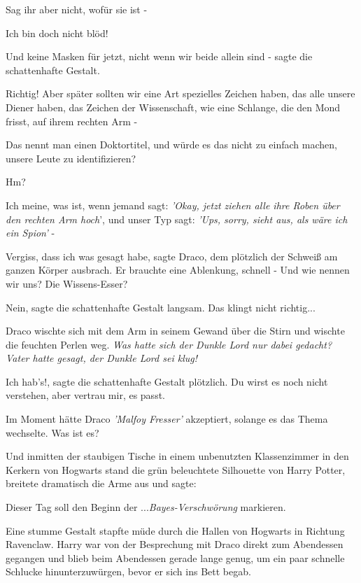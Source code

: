\glqq Sag ihr aber nicht, wofür sie ist -\grqq{}

\glqq Ich bin doch nicht blöd!\grqq{}

\glqq Und keine Masken für jetzt, nicht wenn wir beide allein sind -\grqq{}
sagte die schattenhafte Gestalt.

\glqq Richtig! Aber später sollten wir eine Art spezielles Zeichen haben, das
alle unsere Diener haben, das Zeichen der Wissenschaft, wie eine Schlange, die
den Mond frisst, auf ihrem rechten Arm -\grqq{}

\glqq Das nennt man einen Doktortitel, und würde es das nicht zu einfach machen,
unsere Leute zu identifizieren?\grqq{}

\glqq Hm?\grqq{}

\glqq Ich meine, was ist, wenn jemand sagt: \emph{'Okay, jetzt ziehen alle ihre
Roben über den rechten Arm hoch}', und unser Typ sagt: \emph{'Ups, sorry, sieht
aus, als wäre ich ein Spion'} -\grqq{}

\glqq Vergiss, dass ich was gesagt habe\grqq{}, sagte Draco, dem plötzlich der
Schweiß am ganzen Körper ausbrach. Er brauchte eine Ablenkung, schnell - \glqq
Und wie nennen wir uns? Die Wissens-Esser?\grqq{}

\glqq Nein\grqq{}, sagte die schattenhafte Gestalt langsam. \glqq Das klingt
nicht richtig...\grqq{}

Draco wischte sich mit dem Arm in seinem Gewand über die Stirn und wischte die
feuchten Perlen weg. \emph{Was hatte sich der Dunkle Lord nur dabei gedacht?
Vater hatte gesagt, der Dunkle Lord sei klug!}

\glqq Ich hab's!\grqq{}, sagte die schattenhafte Gestalt plötzlich. \glqq Du
wirst es noch nicht verstehen, aber vertrau mir, es passt.\grqq{}

Im Moment hätte Draco \emph{'Malfoy Fresser' }akzeptiert, solange es das Thema
wechselte. \glqq Was ist es?\grqq{}

Und inmitten der staubigen Tische in einem unbenutzten Klassenzimmer in den
Kerkern von Hogwarts stand die grün beleuchtete Silhouette von Harry Potter,
breitete dramatisch die Arme aus und sagte:

\glqq Dieser Tag soll den Beginn der ...\emph{Bayes-Verschwörung}
markieren.\grqq{}

Eine stumme Gestalt stapfte müde durch die Hallen von Hogwarts in Richtung
Ravenclaw. Harry war von der Besprechung mit Draco direkt zum Abendessen
gegangen und blieb beim Abendessen gerade lange genug, um ein paar schnelle
Schlucke hinunterzuwürgen, bevor er sich ins Bett begab.

